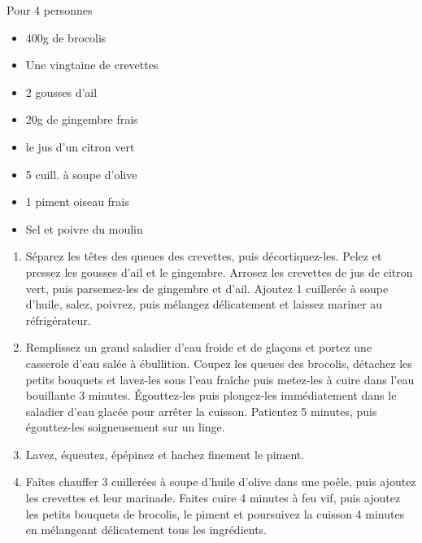 \bigskip
{}
{Pour 4 personnes}{\begin{itemize}
	\item 400g de brocolis
	\item Une vingtaine de crevettes
	\item 2 gousses d'ail
	\item 20g de gingembre frais
	\item le jus d'un citron vert
	\item 5 cuill. à soupe d'olive
	\item 1 piment oiseau frais
	\item Sel et poivre du moulin
\end{itemize}}
{\begin{enumerate}
	\item Séparez les têtes des queues des crevettes, puis décortiquez-les. Pelez et pressez les gousses d'ail et le gingembre. Arrosez les crevettes de jus de citron vert, puis parsemez-les de gingembre et d'ail. Ajoutez 1 cuillerée à soupe d'huile, salez, poivrez, puis mélangez délicatement et laissez mariner au réfrigérateur.
	\item Remplissez un grand saladier d'eau froide et de glaçons et portez une casserole d'eau salée à ébullition. Coupez les queues des brocolis, détachez les petits bouquets et lavez-les sous l'eau fraîche puis metez-les à cuire dans l'eau bouillante 3 minutes. Égouttez-les puis plongez-les immédiatement dans le saladier d'eau glacée pour arrêter la cuisson. Patientez 5 minutes, puis égouttez-les soigneusement sur un linge.
	\item Lavez, équeutez, épépinez et hachez finement le piment.
	\item Faîtes chauffer 3 cuillerées à soupe d'huile d'olive dans une poêle, puis ajoutez les crevettes et leur marinade. Faites cuire 4 minutes à feu vif, puis ajoutez les petits bouquets de brocolis, le piment et poursuivez la cuisson 4 minutes en mélangeant délicatement tous les ingrédients.
\end{enumerate}}

